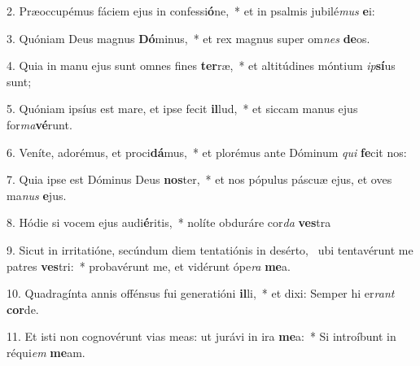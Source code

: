 2. Præoccupémus fáciem ejus in confessi\textbf{ó}ne,~*  et in psalmis jubilé\textit{mus} \textbf{e}i:\

3. Quóniam Deus magnus \textbf{Dó}minus,~*  et rex magnus super om\textit{nes} \textbf{de}os.\

4. Quia in manu ejus sunt omnes fines \textbf{ter}ræ,~*  et altitúdines móntium \textit{ip}\textbf{sí}us sunt;\

5. Quóniam ipsíus est mare, et ipse fecit \textbf{il}lud,~*  et siccam manus ejus for\textit{ma}\textbf{vé}runt.\

6. Veníte, adorémus, et proci\textbf{dá}mus,~*  et plorémus ante Dóminum \textit{qui} \textbf{fe}cit nos:\

7. Quia ipse est Dóminus Deus \textbf{nos}ter,~*  et nos pópulus páscuæ ejus, et oves ma\textit{nus} \textbf{e}jus.\

8. Hódie si vocem ejus audi\textbf{é}ritis,~*  nolíte obduráre cor\textit{da} \textbf{ves}tra\

9. Sicut in irritatióne, secúndum diem tentatiónis in desérto, \dag\  ubi tentavérunt me patres \textbf{ves}tri:~*  probavérunt me, et vidérunt ópe\textit{ra} \textbf{me}a.\

10. Quadragínta annis offénsus fui generatióni \textbf{il}li,~*  et dixi: Semper hi er\textit{rant} \textbf{cor}de.\

11. Et isti non cognovérunt vias meas: ut jurávi in ira \textbf{me}a:~*  Si introíbunt in réqui\textit{em} \textbf{me}am.\


